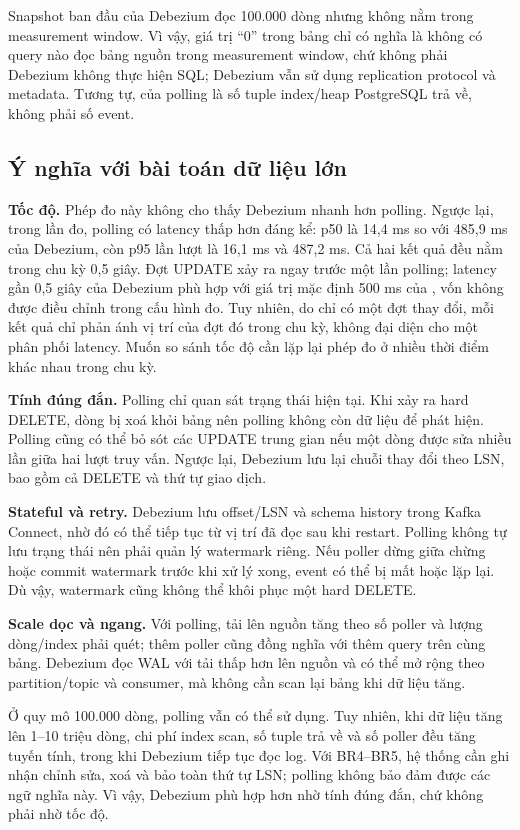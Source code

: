 Snapshot ban đầu của Debezium đọc 100.000 dòng nhưng không nằm trong measurement window. Vì vậy, giá trị ``0'' trong bảng chỉ có nghĩa là không có query nào đọc bảng nguồn trong measurement window, chứ không phải Debezium không thực hiện SQL; Debezium vẫn sử dụng replication protocol và metadata. Tương tự,  của polling là số tuple index/heap PostgreSQL trả về, không phải số event.

\subsection{Ý nghĩa với bài toán dữ liệu lớn}

\textbf{Tốc độ.} Phép đo này không cho thấy Debezium nhanh hơn polling. Ngược lại, trong lần đo, polling có latency thấp hơn đáng kể: p50 là 14,4 ms so với 485,9 ms của Debezium, còn p95 lần lượt là 16,1 ms và 487,2 ms. Cả hai kết quả đều nằm trong chu kỳ 0,5 giây. Đợt UPDATE xảy ra ngay trước một lần polling; latency gần 0,5 giây của Debezium phù hợp với giá trị mặc định 500 ms của , vốn không được điều chỉnh trong cấu hình đo. Tuy nhiên, do chỉ có một đợt thay đổi, mỗi kết quả chỉ phản ánh vị trí của đợt đó trong chu kỳ, không đại diện cho một phân phối latency. Muốn so sánh tốc độ cần lặp lại phép đo ở nhiều thời điểm khác nhau trong chu kỳ.

\textbf{Tính đúng đắn.} Polling chỉ quan sát trạng thái hiện tại. Khi xảy ra hard DELETE, dòng bị xoá khỏi bảng nên polling không còn dữ liệu để phát hiện. Polling cũng có thể bỏ sót các UPDATE trung gian nếu một dòng được sửa nhiều lần giữa hai lượt truy vấn. Ngược lại, Debezium lưu lại chuỗi thay đổi theo LSN, bao gồm cả DELETE và thứ tự giao dịch.

\textbf{Stateful và retry.} Debezium lưu offset/LSN và schema history trong Kafka Connect, nhờ đó có thể tiếp tục từ vị trí đã đọc sau khi restart. Polling không tự lưu trạng thái nên phải quản lý watermark riêng. Nếu poller dừng giữa chừng hoặc commit watermark trước khi xử lý xong, event có thể bị mất hoặc lặp lại. Dù vậy, watermark cũng không thể khôi phục một hard DELETE.

\textbf{Scale dọc và ngang.} Với polling, tải lên nguồn tăng theo số poller và lượng dòng/index phải quét; thêm poller cũng đồng nghĩa với thêm query trên cùng bảng. Debezium đọc WAL với tải thấp hơn lên nguồn và có thể mở rộng theo partition/topic và consumer, mà không cần scan lại bảng khi dữ liệu tăng.

Ở quy mô 100.000 dòng, polling vẫn có thể sử dụng. Tuy nhiên, khi dữ liệu tăng lên 1--10 triệu dòng, chi phí index scan, số tuple trả về và số poller đều tăng tuyến tính, trong khi Debezium tiếp tục đọc log. Với BR4--BR5, hệ thống cần ghi nhận chỉnh sửa, xoá và bảo toàn thứ tự LSN; polling không bảo đảm được các ngữ nghĩa này. Vì vậy, Debezium phù hợp hơn nhờ tính đúng đắn, chứ không phải nhờ tốc độ.

